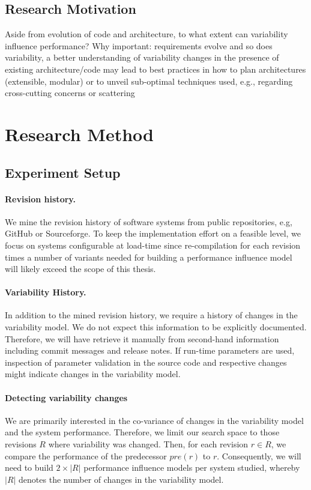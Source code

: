 \documentclass[a4paper,10pt]{scrartcl}
\begin{document}
\subsection{Research Motivation}
Aside from evolution of code and architecture, to what extent can
variability influence performance? Why important: requirements evolve and so
does variability, a better understanding of variability changes in the presence
of existing architecture/code may lead to best practices in how to plan
architectures (extensible, modular) or to unveil sub-optimal techniques used,
e.g., regarding cross-cutting concerns or scattering\cite{siegmund_performance-influence_2015}

\section{Research Method}
\subsection{Experiment Setup}\label{sec:experiment_setup}
				  \paragraph{Revision history.}{We mine the revision history of software
				  systems from public repositories, e.g, GitHub or Sourceforge. To keep the implementation
				  effort on a feasible level, we focus on systems configurable at load-time
				  since re-compilation for each revision times a number of
				  variants needed for building a performance influence model will likely
				  exceed the scope of this thesis.}
				  
				  \paragraph{Variability History.}{In addition to the mined revision
				  history, we require a history of changes in the variability model. We do not
				  expect this information to be explicitly documented. Therefore, we will
				  have retrieve it manually from second-hand information including commit
				  messages and release notes. If run-time parameters are used,
				  inspection of parameter validation in the source code and respective
				  changes might indicate changes in the variability model.}

				  \paragraph{Detecting variability changes}{We are primarily
				  interested in the co-variance of changes in the variability model and the
				  system performance. Therefore, we limit our search space to those 
				  revisions $R$ where variability was changed. Then, for each revision $r
				  \in R$, we compare the performance of the predecessor $pre(r)$ to $r$.
				  Consequently, we will need to build $2 \times |R|$ performance influence
				  models per system studied, whereby $|R|$ denotes the number of changes in
				  the variability model.}
\end{document}
